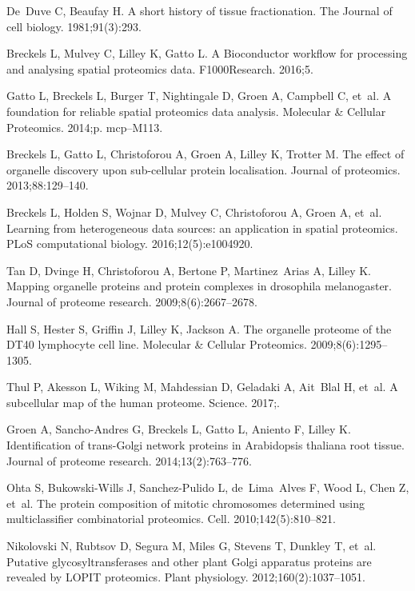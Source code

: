 \documentclass[10pt,letterpaper]{article}\usepackage[]{graphicx}\usepackage[]{color}
\begin{document}
\begin{thebibliography}{10}
De~Duve C, Beaufay H.
\newblock A short history of tissue fractionation.
\newblock The Journal of cell biology. 1981;91(3):293.

Breckels L, Mulvey C, Lilley K, Gatto L.
\newblock A Bioconductor workflow for processing and analysing spatial
  proteomics data.
\newblock F1000Research. 2016;5.

Gatto L, Breckels L, Burger T, Nightingale D, Groen A, Campbell C, et~al.
\newblock A foundation for reliable spatial proteomics data analysis.
\newblock Molecular \& Cellular Proteomics. 2014;p. mcp--M113.

Breckels L, Gatto L, Christoforou A, Groen A, Lilley K, Trotter M.
\newblock The effect of organelle discovery upon sub-cellular protein
  localisation.
\newblock Journal of proteomics. 2013;88:129--140.

Breckels L, Holden S, Wojnar D, Mulvey C, Christoforou A, Groen A, et~al.
\newblock Learning from heterogeneous data sources: an application in spatial
  proteomics.
\newblock PLoS computational biology. 2016;12(5):e1004920.

Tan D, Dvinge H, Christoforou A, Bertone P, Martinez~Arias A, Lilley K.
\newblock Mapping organelle proteins and protein complexes in drosophila
  melanogaster.
\newblock Journal of proteome research. 2009;8(6):2667--2678.

Hall S, Hester S, Griffin J, Lilley K, Jackson A.
\newblock The organelle proteome of the DT40 lymphocyte cell line.
\newblock Molecular \& Cellular Proteomics. 2009;8(6):1295--1305.

Thul P, Akesson L, Wiking M, Mahdessian D, Geladaki A, Ait~Blal H, et~al.
\newblock A subcellular map of the human proteome.
\newblock Science. 2017;.

Groen A, Sancho-Andres G, Breckels L, Gatto L, Aniento F, Lilley K.
\newblock Identification of trans-Golgi network proteins in Arabidopsis
  thaliana root tissue.
\newblock Journal of proteome research. 2014;13(2):763--776.

Ohta S, Bukowski-Wills J, Sanchez-Pulido L, de~Lima~Alves F, Wood L, Chen Z,
  et~al.
\newblock The protein composition of mitotic chromosomes determined using
  multiclassifier combinatorial proteomics.
\newblock Cell. 2010;142(5):810--821.

Nikolovski N, Rubtsov D, Segura M, Miles G, Stevens T, Dunkley T, et~al.
\newblock Putative glycosyltransferases and other plant Golgi apparatus
  proteins are revealed by LOPIT proteomics.
\newblock Plant physiology. 2012;160(2):1037--1051.


\end{thebibliography}
\end{document}

